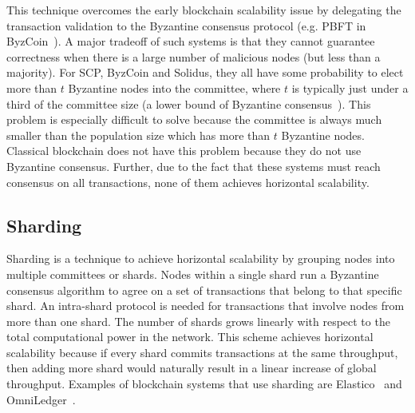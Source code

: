 This technique overcomes the early blockchain scalability issue by delegating the transaction validation to the Byzantine consensus protocol (e.g. PBFT in ByzCoin~\cite{kogias2016enhancing}).
A major tradeoff of such systems is that they cannot guarantee correctness when there is a large number of malicious nodes (but less than a majority).
For SCP, ByzCoin and Solidus, they all have some probability to elect more than $t$ Byzantine nodes into the committee,
where $t$ is typically just under a third of the committee size (a lower bound of Byzantine consensus~\cite{pease1980reaching}).
This problem is especially difficult to solve because the committee is always much smaller than the population size which has more than $t$ Byzantine nodes.
Classical blockchain does not have this problem because they do not use Byzantine consensus.
Further, due to the fact that these systems must reach consensus on all transactions, none of them achieves horizontal scalability.


\subsection{Sharding}

Sharding is a technique to achieve horizontal scalability by grouping nodes into multiple committees or shards.
Nodes within a single shard run a Byzantine consensus algorithm to agree on a set of transactions that belong to that specific shard.
An intra-shard protocol is needed for transactions that involve nodes from more than one shard.
The number of shards grows linearly with respect to the total computational power in the network.
This scheme achieves horizontal scalability because if every shard commits transactions at the same throughput,
then adding more shard would naturally result in a linear increase of global throughput.
Examples of blockchain systems that use sharding are Elastico~\cite{luu2016elastico} and OmniLedger~\cite{kokoris2017omniledger}.

